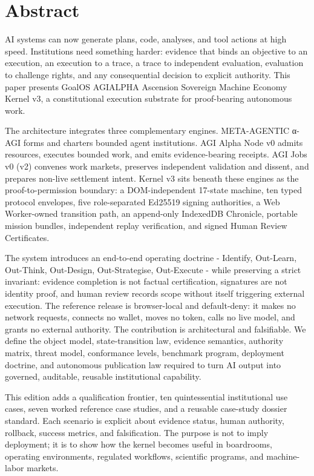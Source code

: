 \section{Abstract}\label{abstract}

AI systems can now generate plans, code, analyses, and tool actions at
high speed. Institutions need something harder: evidence that binds an
objective to an execution, an execution to a trace, a trace to
independent evaluation, evaluation to challenge rights, and any
consequential decision to explicit authority. This paper presents GoalOS
AGIALPHA Ascension Sovereign Machine Economy Kernel v3, a constitutional
execution substrate for proof-bearing autonomous work.

The architecture integrates three complementary engines. META-AGENTIC
α-AGI forms and charters bounded agent institutions. AGI Alpha Node v0
admits resources, executes bounded work, and emits evidence-bearing
receipts. AGI Jobs v0 (v2) convenes work markets, preserves independent
validation and dissent, and prepares non-live settlement intent. Kernel
v3 sits beneath these engines as the proof-to-permission boundary: a
DOM-independent 17-state machine, ten typed protocol envelopes, five
role-separated Ed25519 signing authorities, a Web Worker-owned
transition path, an append-only IndexedDB Chronicle, portable mission
bundles, independent replay verification, and signed Human Review
Certificates.

The system introduces an end-to-end operating doctrine - Identify,
Out-Learn, Out-Think, Out-Design, Out-Strategise, Out-Execute - while
preserving a strict invariant: evidence completion is not factual
certification, signatures are not identity proof, and human review
records scope without itself triggering external execution. The
reference release is browser-local and default-deny: it makes no network
requests, connects no wallet, moves no token, calls no live model, and
grants no external authority. The contribution is architectural and
falsifiable. We define the object model, state-transition law, evidence
semantics, authority matrix, threat model, conformance levels, benchmark
program, deployment doctrine, and autonomous publication law required to
turn AI output into governed, auditable, reusable institutional
capability.

This edition adds a qualification frontier, ten quintessential
institutional use cases, seven worked reference case studies, and a
reusable case-study dossier standard. Each scenario is explicit about
evidence status, human authority, rollback, success metrics, and
falsification. The purpose is not to imply deployment; it is to show how
the kernel becomes useful in boardrooms, operating environments,
regulated workflows, scientific programs, and machine-labor markets.

